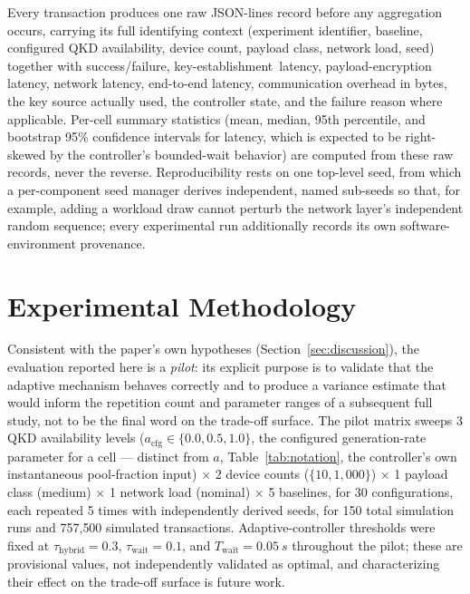 \documentclass[journal]{IEEEtran}
\newcommand{\keyest}{key-establishment}
\newcommand{\qkdavail}{\ensuremath{a}}
\newcommand{\acfg}{\ensuremath{a_{\text{cfg}}}}
\begin{document}
Every transaction produces one raw JSON-lines record before any aggregation occurs, carrying its full identifying context (experiment identifier, baseline, configured QKD availability, device count, payload class, network load, seed) together with success/failure, \keyest\ latency, payload-encryption latency, network latency, end-to-end latency, communication overhead in bytes, the key source actually used, the controller state, and the failure reason where applicable. Per-cell summary statistics (mean, median, 95th percentile, and bootstrap 95\% confidence intervals for latency, which is expected to be right-skewed by the controller's bounded-wait behavior) are computed from these raw records, never the reverse. Reproducibility rests on one top-level seed, from which a per-component seed manager derives independent, named sub-seeds so that, for example, adding a workload draw cannot perturb the network layer's independent random sequence; every experimental run additionally records its own software-environment provenance.

\section{Experimental Methodology}
\label{sec:methodology}

Consistent with the paper's own hypotheses (Section~\ref{sec:discussion}), the evaluation reported here is a \emph{pilot}: its explicit purpose is to validate that the adaptive mechanism behaves correctly and to produce a variance estimate that would inform the repetition count and parameter ranges of a subsequent full study, not to be the final word on the trade-off surface. The pilot matrix sweeps 3 QKD availability levels ($\acfg \in \{0.0, 0.5, 1.0\}$, the configured generation-rate parameter for a cell --- distinct from $\qkdavail$, Table~\ref{tab:notation}, the controller's own instantaneous pool-fraction input) $\times$ 2 device counts ($\{10, 1{,}000\}$) $\times$ 1 payload class (medium) $\times$ 1 network load (nominal) $\times$ 5 baselines, for 30 configurations, each repeated 5 times with independently derived seeds, for 150 total simulation runs and 757{,}500 simulated transactions. Adaptive-controller thresholds were fixed at $\tau_{\text{hybrid}} = 0.3$, $\tau_{\text{wait}} = 0.1$, and $T_{\text{wait}} = \qty{0.05}{s}$ throughout the pilot; these are provisional values, not independently validated as optimal, and characterizing their effect on the trade-off surface is future work.
\end{document}
